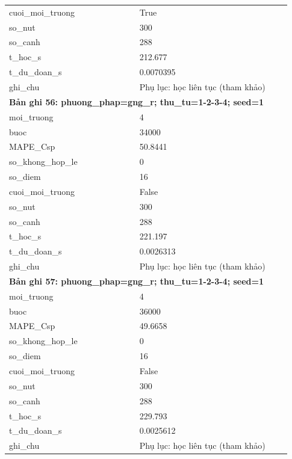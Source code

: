 \begin{longtable}{p{0.43\linewidth}p{0.50\linewidth}}
cuoi\_\allowbreak moi\_\allowbreak truong & True \\
so\_\allowbreak nut & 300 \\
so\_\allowbreak canh & 288 \\
t\_\allowbreak hoc\_\allowbreak s & 212.677 \\
t\_\allowbreak du\_\allowbreak doan\_\allowbreak s & 0.0070395 \\
ghi\_\allowbreak chu & Phụ lục: học liên tục (tham khảo) \\
\midrule
\multicolumn{2}{p{0.95\linewidth}}{\textbf{Bản ghi 56: phuong\_phap=gng\_r; thu\_tu=1-2-3-4; seed=1}} \\
moi\_\allowbreak truong & 4 \\
buoc & 34000 \\
MAPE\_\allowbreak Csp & 50.8441 \\
so\_\allowbreak khong\_\allowbreak hop\_\allowbreak le & 0 \\
so\_\allowbreak diem & 16 \\
cuoi\_\allowbreak moi\_\allowbreak truong & False \\
so\_\allowbreak nut & 300 \\
so\_\allowbreak canh & 288 \\
t\_\allowbreak hoc\_\allowbreak s & 221.197 \\
t\_\allowbreak du\_\allowbreak doan\_\allowbreak s & 0.0026313 \\
ghi\_\allowbreak chu & Phụ lục: học liên tục (tham khảo) \\
\midrule
\multicolumn{2}{p{0.95\linewidth}}{\textbf{Bản ghi 57: phuong\_phap=gng\_r; thu\_tu=1-2-3-4; seed=1}} \\
moi\_\allowbreak truong & 4 \\
buoc & 36000 \\
MAPE\_\allowbreak Csp & 49.6658 \\
so\_\allowbreak khong\_\allowbreak hop\_\allowbreak le & 0 \\
so\_\allowbreak diem & 16 \\
cuoi\_\allowbreak moi\_\allowbreak truong & False \\
so\_\allowbreak nut & 300 \\
so\_\allowbreak canh & 288 \\
t\_\allowbreak hoc\_\allowbreak s & 229.793 \\
t\_\allowbreak du\_\allowbreak doan\_\allowbreak s & 0.0025612 \\
ghi\_\allowbreak chu & Phụ lục: học liên tục (tham khảo) \\

\end{longtable}
